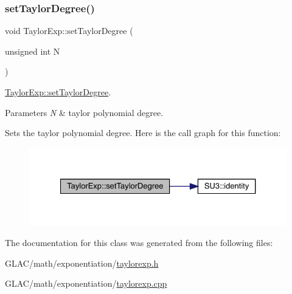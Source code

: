 \subsubsection{\texorpdfstring{setTaylorDegree()}{setTaylorDegree()}}
{\footnotesize\ttfamily void Taylor\+Exp\+::set\+Taylor\+Degree (\begin{DoxyParamCaption}\item[{unsigned int}]{N }\end{DoxyParamCaption})}



\mbox{\hyperlink{class_taylor_exp_a6a048363483f372300e412b27f218773}{Taylor\+Exp\+::set\+Taylor\+Degree}}. 


\begin{DoxyParams}{Parameters}
{\em N} & taylor polynomial degree.\\
\hline
\end{DoxyParams}
Sets the taylor polynomial degree. Here is the call graph for this function\+:
\nopagebreak
\begin{figure}[H]
\begin{center}
\leavevmode
\includegraphics[width=327pt]{class_taylor_exp_a6a048363483f372300e412b27f218773_cgraph}
\end{center}
\end{figure}


The documentation for this class was generated from the following files\+:\begin{DoxyCompactItemize}
\item 
G\+L\+A\+C/math/exponentiation/\mbox{\hyperlink{taylorexp_8h}{taylorexp.\+h}}\item 
G\+L\+A\+C/math/exponentiation/\mbox{\hyperlink{taylorexp_8cpp}{taylorexp.\+cpp}}\end{DoxyCompactItemize}
